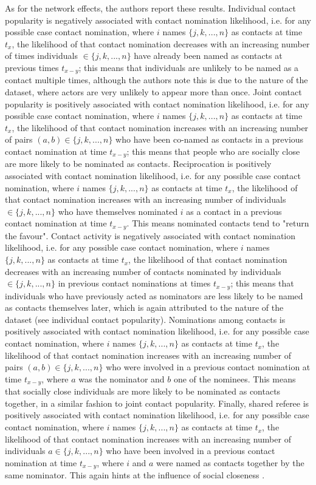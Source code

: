 As for the network effects, the authors report these results. Individual contact popularity is negatively associated with contact nomination likelihood, i.e. for any possible case contact nomination, where $i$ names $\{j,k,...,n\}$ as contacts at time $t_x$, the likelihood of that contact nomination decreases with an increasing number of times individuals $\in \{j,k,...,n\}$ have already been named as contacts at previous times $t_{x-y}$; this means that individuals are unlikely to be named as a contact multiple times, although the authors note this is due to the nature of the dataset, where actors are very unlikely to appear more than once. Joint contact popularity is positively associated with contact nomination likelihood, i.e. for any possible case contact nomination, where $i$ names $\{j,k,...,n\}$ as contacts at time $t_x$, the likelihood of that contact nomination increases with an increasing number of pairs $(a,b) \in \{j,k,...,n\}$ who have been co-named as contacts in a previous contact nomination at time $t_{x-y}$; this means that people who are socially close are more likely to be nominated as contacts. Reciprocation is positively associated with contact nomination likelihood, i.e. for any possible case contact nomination, where $i$ names $\{j,k,...,n\}$ as contacts at time $t_{x}$, the likelihood of that contact nomination increases with an increasing number of individuals $\in \{j,k,...,n\}$ who have themselves nominated $i$ as a contact in a previous contact nomination at time $t_{x-y}$. This means nominated contacts tend to "return the favour". Contact activity is negatively associated with contact nomination likelihood, i.e. for any possible case contact nomination, where $i$ names $\{j,k,...,n\}$ as contacts at time $t_x$, the likelihood of that contact nomination decreases with an increasing number of contacts nominated by individuals $\in \{j,k,...,n\}$ in previous contact nominations at times $t_{x-y}$; this means that individuals who have previously acted as nominators are less likely to be named as contacts themselves later, which is again attributed to the nature of the dataset (see individual contact popularity). Nominations among contacts is positively associated with contact nomination likelihood, i.e. for any possible case contact nomination, where $i$ names $\{j,k,...,n\}$ as contacts at time $t_x$, the likelihood of that contact nomination increases with an increasing number of pairs $(a,b) \in \{j,k,...,n\}$ who were involved in a previous contact nomination at time $t_{x-y}$, where $a$ was the nominator and $b$ one of the nominees. This means that socially close individuals are more likely to be nominated as contacts together, in a similar fashion to joint contact popularity. Finally, shared referee is positively associated with contact nomination likelihood, i.e. for any possible case contact nomination, where $i$ names $\{j,k,...,n\}$ as contacts at time $t_x$, the likelihood of that contact nomination increases with an increasing number of individuals $a \in \{j,k,...,n\}$ who have been involved in a previous contact nomination at time $t_{x-y}$, where $i$ and $a$ were named as contacts together by the same nominator. This again hints at the influence of social closeness \cite{hancean2021role}.

